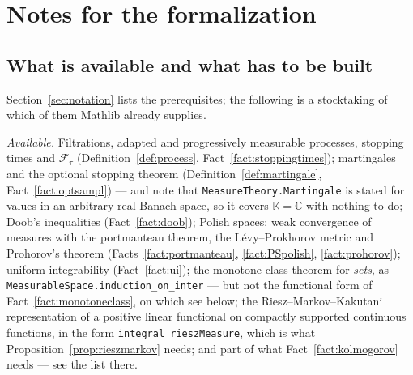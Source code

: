 \documentclass[11pt,a4paper]{article}
\theoremstyle{plain}
\theoremstyle{definition}
\theoremstyle{remark}
\newcommand{\Filt}{\mathcal{F}}
\newcommand{\K}{\mathbb{K}}
\newcommand{\C}{\mathbb{C}}
\begin{document}
\section{Notes for the formalization}
\label{sec:formalization}

\subsection{What is available and what has to be built}
\label{ssec:available}

Section~\ref{sec:notation} lists the prerequisites; the following is a stocktaking
of which of them Mathlib already supplies.

\emph{Available.}  Filtrations, adapted and progressively measurable processes,
stopping times and $\Filt_\tau$ (Definition~\ref{def:process},
Fact~\ref{fact:stoppingtimes}); martingales and the optional stopping theorem
(Definition~\ref{def:martingale}, Fact~\ref{fact:optsampl}) --- and note that
\texttt{MeasureTheory.Martingale} is stated for values in an arbitrary real
Banach space, so it covers $\K = \C$ with nothing to do; Doob's inequalities
(Fact~\ref{fact:doob}); Polish spaces; weak convergence of measures with the
portmanteau theorem, the L\'evy--Prokhorov metric and Prohorov's theorem
(Facts~\ref{fact:portmanteau}, \ref{fact:PSpolish}, \ref{fact:prohorov});
uniform integrability (Fact~\ref{fact:ui}); the monotone class theorem for
\emph{sets}, as \texttt{MeasurableSpace.}\allowbreak\texttt{induction\_on\_inter} --- but not
the
functional form of Fact~\ref{fact:monotoneclass}, on which see below; the
Riesz--Markov--Kakutani representation of a
positive linear functional on compactly supported continuous functions, in the
form \texttt{integral\_rieszMeasure}, which is what
Proposition~\ref{prop:rieszmarkov} needs; and part of what
Fact~\ref{fact:kolmogorov} needs --- see the list there.
\end{document}
